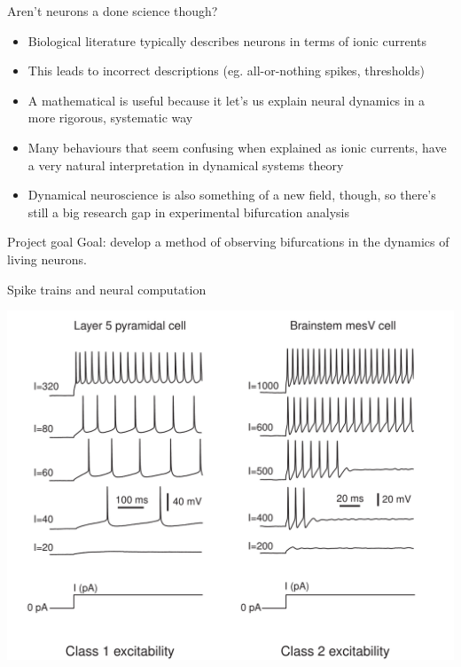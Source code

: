 \documentclass[aspectratio=169]{beamer}
\begin{document}
\begin{frame}[label={sec:org5c33024}]{Aren't neurons a done science though?}
\begin{itemize}[<+->]
\item Biological literature typically describes neurons in terms of ionic currents
\item This leads to incorrect descriptions (eg. all-or-nothing spikes, thresholds)
\item A mathematical is useful because it let's us explain neural dynamics in a more rigorous, systematic way
\item Many behaviours that seem confusing when explained as ionic currents, have a very natural interpretation in dynamical systems theory
\item Dynamical neuroscience is also something of a new field, though, so there's still a big research gap in experimental bifurcation analysis
\end{itemize}
\end{frame}

\begin{frame}[label={sec:org6be62d05}]{Project goal}
Goal: develop a method of observing bifurcations in the dynamics of living neurons.
\end{frame}

\begin{frame}[plain,label={sec:org0bea7ed}]{Spike trains and neural computation}
\begin{center}
\includegraphics[height=\textheight]{./excitability_classes.png}
\end{center}
\end{frame}
\end{document}
